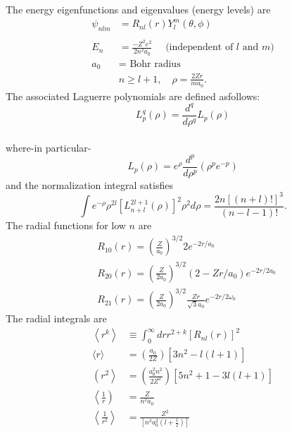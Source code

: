 \documentclass{article}
\begin{document}
The energy eigenfunctions and eigenvalues (energy levels) are
\begin{equation}
\begin{aligned}
\psi_{n l m} &=R_{n l}(r) Y_{l}^{m}(\theta, \phi) \\
 \\
E_{n} &\left.=\frac{-Z^{2} e^{2}}{2 n^{2} a_{0}} \quad \text { (independent of } l \text { and } m) \\
a_{0} &=\text { Bohr radius } \\
&n \geq l+1, \quad \rho=\frac{2 Z r}{m a_{0}}.
\end{aligned}
\end{equation}
The associated Laguerre polynomials are defined asfollows:
\begin{equation}
L_{p}^{q}(\rho)=\frac{d^{q}}{d \rho^{q}} L_{p}(\rho)
\end{equation}
\\
where-in particular-
\begin{equation}
L_{p}(\rho)=e^{\rho} \frac{d^{p}}{d \rho^{p}}\left(\rho^{p} e^{-p}\right)
\end{equation}
and the normalization integral satisfies
\begin{equation}
\int e^{-\rho} \rho^{2 l}\left[L_{n+l}^{2 l+1}(\rho)\right]^{2} \rho^{2} d \rho=\frac{2 n[(n+l) !]^{3}}{(n-l-1) !} .
\end{equation}
The radial functions for low $n$ are
\begin{equation}
\begin{aligned}
&R_{10}(r)=\left(\frac{Z}{a_{0}}\right)^{3 / 2} 2 e^{-2 r / a_{0}} \\
&R_{20}(r)=\left(\frac{Z}{2 a_{0}}\right)^{3 / 2}\left(2-Z r / a_{0}\right) e^{-2 r / 2 a_{0}} \\
&R_{21}(r)=\left(\frac{Z}{2 a_{0}}\right)^{3 / 2} \frac{Z r}{\sqrt{3} a_{0}} e^{-2 r / 2 \omega_{0}}
\end{aligned}
\end{equation}
The radial integrals are
\begin{equation}
\begin{aligned}
\left\langle r^{k}\right\rangle & \equiv \int_{0}^{\infty} d r r^{2+k}\left[R_{n l}(r)\right]^{2} \\
\langle r\rangle &=\left(\frac{a_{0}}{2 Z}\right)\left[3 n^{2}-l(l+1)\right] \\
\left(r^{2}\right\rangle &=\left(\frac{a_{0}^{2} n^{2}}{2 Z^{2}}\right)\left[5 n^{2}+1-3 l(l+1)\right] \\
\left\langle\frac{1}{r}\right) &=\frac{Z}{n^{2} a_{0}} \\
\left\langle\frac{1}{r^{2}}\right\rangle &=\frac{Z^{2}}{\left[n^{3} a_{0}^{2}\left(l+\frac{1}{2}\right)\right]}
\end{aligned}
\end{equation}
\end{document}
